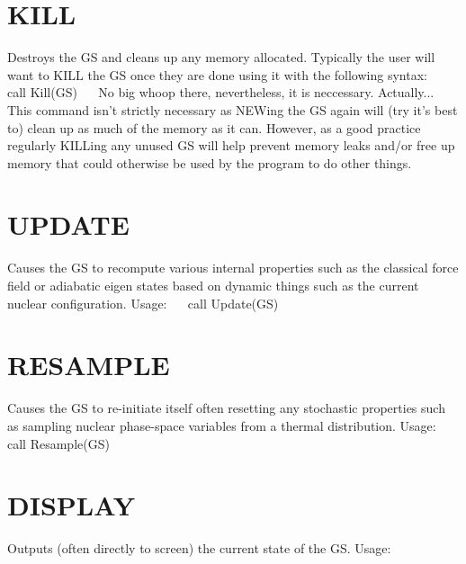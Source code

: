 \hypertarget{_interface_KILL}{}\section{K\+I\+L\+L}\label{_interface_KILL}
Destroys the G\+S and cleans up any memory allocated. Typically the user will want to K\+I\+L\+L the G\+S once they are done using it with the following syntax\+:~\newline
~\newline
 call Kill(\+G\+S)~\newline
~\newline
No big whoop there, nevertheless, it is neccessary. Actually... This command isn't strictly necessary as N\+E\+Wing the G\+S again will (try it's best to) clean up as much of the memory as it can. However, as a good practice regularly K\+I\+L\+Ling any unused G\+S will help prevent memory leaks and/or free up memory that could otherwise be used by the program to do other things.~\newline
\hypertarget{_interface_UPDATE}{}\section{U\+P\+D\+A\+T\+E}\label{_interface_UPDATE}
Causes the G\+S to recompute various internal properties such as the classical force field or adiabatic eigen states based on dynamic things such as the current nuclear configuration. Usage\+:~\newline
~\newline
 call Update(\+G\+S) ~\newline
\hypertarget{_interface_RESAMPLE}{}\section{R\+E\+S\+A\+M\+P\+L\+E}\label{_interface_RESAMPLE}
Causes the G\+S to re-\/initiate itself often resetting any stochastic properties such as sampling nuclear phase-\/space variables from a thermal distribution. Usage\+:~\newline
~\newline
 call Resample(\+G\+S)~\newline
\hypertarget{_interface_DISPLAY}{}\section{D\+I\+S\+P\+L\+A\+Y}\label{_interface_DISPLAY}
Outputs (often directly to screen) the current state of the G\+S. Usage\+:~\newline

